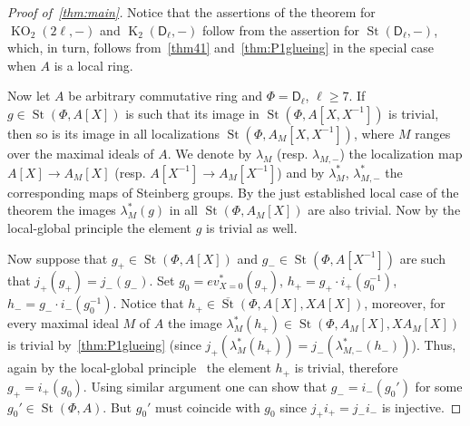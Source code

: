 \documentclass[oneside, 8pt]{amsart}
\theoremstyle{remark}
\theoremstyle{definition}
\numberwithin{lemma}{section}
\numberwithin{prop}{section}
\numberwithin{corollary}{section}
\numberwithin{externaltheorem}{section}
\DeclareMathOperator{\St}{St}
\DeclareMathOperator{\K}{K}
\DeclareMathOperator{\KO}{KO}
\newcommand{\inv}{^{-1}}
\newcommand{\rD}{\mathsf{D}}
\numberwithin{equation}{section}
\begin{document}
\begin{proof}[Proof of~\cref{thm:main}]
 Notice that the assertions of the theorem for $\KO_2(2\ell, -)$ and $\K_2(\rD_\ell, -)$ follow from the assertion for $\St(\rD_\ell, -)$,
 which, in turn, follows from~\cref{thm41} and~\cref{thm:P1glueing} in the special case when $A$ is a local ring.
 
 Now let $A$ be arbitrary commutative ring and $\Phi = \rD_\ell$, $\ell \geq 7$. If $g \in \St(\Phi, A[X])$ is such that its image in $\St(\Phi, A[X, X\inv])$ is trivial, then so is its image in all localizations $\St(\Phi, A_M[X, X\inv])$, where $M$ ranges over the maximal ideals of $A$.
 We denote by $\lambda_{M}$ (resp. $\lambda_{M, -}$) the localization map $A[X] \to A_M[X]$ (resp. $A[X\inv] \to A_M[X\inv]$) and by $\lambda_M^*$, $\lambda_{M,-}^*$ the corresponding maps of Steinberg groups.
 By the just established local case of the theorem the images $\lambda^*_M(g)$ in all $\St(\Phi, A_M[X])$ are also trivial. Now by the local-global principle \cite[Theorem~2]{LS17} the element $g$ is trivial as well.

 Now suppose that $g_+ \in \St(\Phi, A[X])$ and $g_- \in \St(\Phi, A[X\inv])$ are such that $j_+(g_+) = j_-(g_-)$. Set $g_0 = ev^*_{X=0}(g_+)$, $h_+ = g_+ \cdot i_+(g_0^{-1})$, $h_- = g_- \cdot i_-(g_0^{-1})$.
 Notice that $h_+ \in \overline{\St}(\Phi, A[X], XA[X])$, moreover, for every maximal ideal $M$ of $A$ the image $\lambda_M^*(h_+)\in \St(\Phi, A_M[X], XA_M[X])$ is trivial by~\cref{thm:P1glueing}
  (since $j_+(\lambda^*_M(h_+)) = j_-(\lambda^*_{M,-}(h_-))$).
 Thus, again by the local-global principle~\cite[Theorem~2]{LS17} the element $h_+$ is trivial, therefore $g_+ = i_+(g_0)$.
 Using similar argument one can show that $g_- = i_-(g_0')$ for some $g_0' \in \St(\Phi, A)$. But $g_0'$ must coincide with $g_0$ since $j_+i_+ = j_-i_-$ is injective.
\end{proof}

\printbibliography
\end{document}
